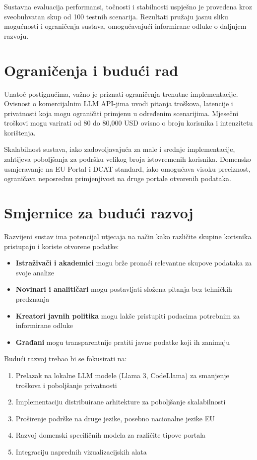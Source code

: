 Sustavna evaluacija performansi, točnosti i stabilnosti uspješno je provedena kroz sveobuhvatan skup od 100 testnih scenarija. Rezultati pružaju jasnu sliku mogućnosti i ograničenja sustava, omogućavajući informirane odluke o daljnjem razvoju.

\section{Ograničenja i budući rad}

Unatoč postignućima, važno je priznati ograničenja trenutne implementacije. Ovisnost o komercijalnim LLM API-jima uvodi pitanja troškova, latencije i privatnosti koja mogu ograničiti primjenu u određenim scenarijima. Mjesečni troškovi mogu varirati od 80 do 80,000 USD ovisno o broju korisnika i intenzitetu korištenja.

Skalabilnost sustava, iako zadovoljavajuća za male i srednje implementacije, zahtijeva poboljšanja za podršku velikog broja istovremenih korisnika. Domensko usmjeravanje na EU Portal i DCAT standard, iako omogućava visoku preciznost, ograničava neposrednu primjenjivost na druge portale otvorenih podataka.

\section{Smjernice za budući razvoj}

Razvijeni sustav ima potencijal utjecaja na način kako različite skupine korisnika pristupaju i koriste otvorene podatke:

\begin{itemize}
    \item \textbf{Istraživači i akademici} mogu brže pronaći relevantne skupove podataka za svoje analize
    \item \textbf{Novinari i analitičari} mogu postavljati složena pitanja bez tehničkih predznanja
    \item \textbf{Kreatori javnih politika} mogu lakše pristupiti podacima potrebnim za informirane odluke
    \item \textbf{Građani} mogu transparentnije pratiti javne podatke koji ih zanimaju
\end{itemize}

Budući razvoj trebao bi se fokusirati na:

\begin{enumerate}
    \item Prelazak na lokalne LLM modele (Llama 3, CodeLlama) za smanjenje troškova i poboljšanje privatnosti
    \item Implementaciju distribuirane arhitekture za poboljšanje skalabilnosti
    \item Proširenje podrške na druge jezike, posebno nacionalne jezike EU
    \item Razvoj domenski specifičnih modela za različite tipove portala
    \item Integraciju naprednih vizualizacijskih alata
\end{enumerate}

